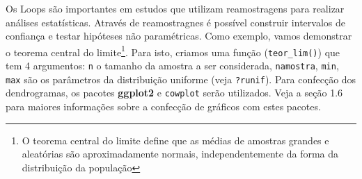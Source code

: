 \documentclass[
]{book}
\begin{document}
Os Loops são importantes em estudos que utilizam reamostragens para realizar análises estatísticas. Através de reamostragnes é possível construir intervalos de confiança e testar hipóteses não paramétricas. Como exemplo, vamos demonstrar o teorema central do limite\footnote{O teorema central do limite define que as médias de amostras grandes e aleatórias são aproximadamente normais, independentemente da forma da distribuição da população}. Para isto, criamos uma função (\texttt{teor\_lim()})  que tem 4 argumentos: \texttt{n} o tamanho da amostra a ser considerada, \texttt{namostra}, \texttt{min}, \texttt{max} são os parâmetros da distribuição uniforme (veja \texttt{?runif}). Para confecção dos dendrogramas, os pacotes \textbf{ggplot2} e \texttt{cowplot} serão utilizados. Veja a seção 1.6 para maiores informações sobre a confecção de gráficos com estes pacotes. 
\end{document}
